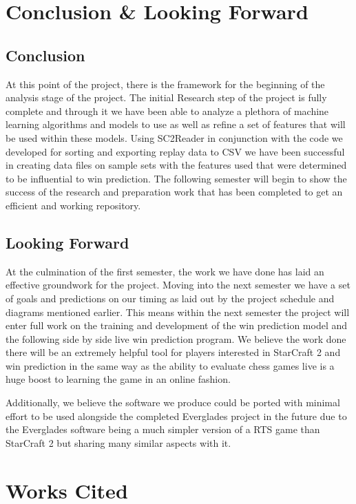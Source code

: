 \documentclass[a4paper,12pt]{report}
\begin{document}
\chapter{Conclusion \& Looking Forward}

\section{Conclusion}
At this point of the project, there is the framework for the beginning of the analysis stage of the project. The initial Research step of the project is fully complete and through it we have been able to analyze a plethora of machine learning algorithms and models to use as well as refine a set of features that will be used within these models. Using SC2Reader in conjunction with the code we developed for sorting and exporting replay data to CSV we have been successful in creating data files on sample sets with the features used that were determined to be influential to win prediction. The following semester will begin to show the success of the research and preparation work that has been completed to get an efficient and working repository.

\section{Looking Forward}
At the culmination of the first semester, the work we have done has laid an effective groundwork for the project. Moving into the next semester we have a set of goals and predictions on our timing as laid out by the project schedule and diagrams mentioned earlier. This means within the next semester the project will enter full work on the training and development of the win prediction model and the following side by side live win prediction program. We believe the work done there will be an extremely helpful tool for players interested in StarCraft 2 and win prediction in the same way as the ability to evaluate chess games live is a huge boost to learning the game in an online fashion.

Additionally, we believe the software we produce could be ported with minimal effort to be used alongside the completed Everglades project in the future due to the Everglades software being a much simpler version of a RTS game than StarCraft 2 but sharing many similar aspects with it.

\chapter{Works Cited}
\end{document}
